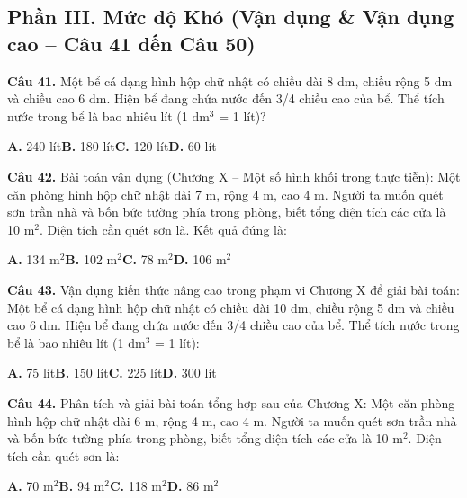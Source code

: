 \documentclass[11pt,a4paper]{article}
\begin{document}
\subsection*{\color{accent} Phần III. Mức độ Khó (Vận dụng \& Vận dụng cao -- Câu 41 đến Câu 50)}
\textbf{\color{primary} Câu 41.} Một bể cá dạng hình hộp chữ nhật có chiều dài 8 dm, chiều rộng 5 dm và chiều cao 6 dm. Hiện bể đang chứa nước đến 3/4 chiều cao của bể. Thể tích nước trong bể là bao nhiêu lít (1 dm$^3$ = 1 lít)?\par
\hspace*{1.5em}\textbf{A.} 240 lít\quad\quad \textbf{B.} 180 lít\quad\quad \textbf{C.} 120 lít\quad\quad \textbf{D.} 60 lít\par\vspace{2pt}
\textbf{\color{primary} Câu 42.} Bài toán vận dụng (Chương X – Một số hình khối trong thực tiễn): Một căn phòng hình hộp chữ nhật dài 7 m, rộng 4 m, cao 4 m. Người ta muốn quét sơn trần nhà và bốn bức tường phía trong phòng, biết tổng diện tích các cửa là 10 m$^2$. Diện tích cần quét sơn là. Kết quả đúng là:\par
\hspace*{1.5em}\textbf{A.} 134 m$^2$\quad\quad \textbf{B.} 102 m$^2$\quad\quad \textbf{C.} 78 m$^2$\quad\quad \textbf{D.} 106 m$^2$\par\vspace{2pt}
\textbf{\color{primary} Câu 43.} Vận dụng kiến thức nâng cao trong phạm vi Chương X để giải bài toán: Một bể cá dạng hình hộp chữ nhật có chiều dài 10 dm, chiều rộng 5 dm và chiều cao 6 dm. Hiện bể đang chứa nước đến 3/4 chiều cao của bể. Thể tích nước trong bể là bao nhiêu lít (1 dm$^3$ = 1 lít):\par
\hspace*{1.5em}\textbf{A.} 75 lít\quad\quad \textbf{B.} 150 lít\quad\quad \textbf{C.} 225 lít\quad\quad \textbf{D.} 300 lít\par\vspace{2pt}
\textbf{\color{primary} Câu 44.} Phân tích và giải bài toán tổng hợp sau của Chương X: Một căn phòng hình hộp chữ nhật dài 6 m, rộng 4 m, cao 4 m. Người ta muốn quét sơn trần nhà và bốn bức tường phía trong phòng, biết tổng diện tích các cửa là 10 m$^2$. Diện tích cần quét sơn là:\par
\hspace*{1.5em}\textbf{A.} 70 m$^2$\quad\quad \textbf{B.} 94 m$^2$\quad\quad \textbf{C.} 118 m$^2$\quad\quad \textbf{D.} 86 m$^2$\par\vspace{2pt}
\end{document}
